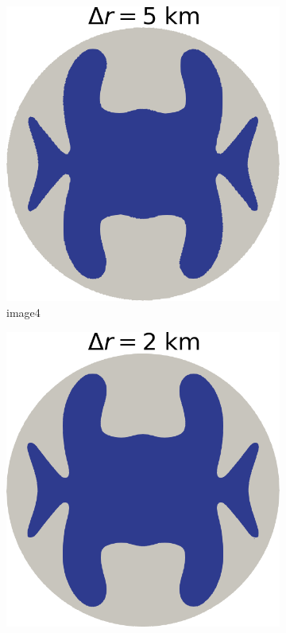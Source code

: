 \documentclass{article}
\begin{document}
\begin{figure}[!h]
	\medskip
	\begin{subfigure}{0.25\textwidth}
		\includegraphics[width=\linewidth]{../fig/Grounded_zone_5km.png}
		\caption{image4}
		\label{fig:4}
	\end{subfigure}\hfil %
	\begin{subfigure}{0.25\textwidth}
		\includegraphics[width=\linewidth]{../fig/Grounded_zone_2km.png}

\end{subfigure}
\end{figure}
\end{document}
